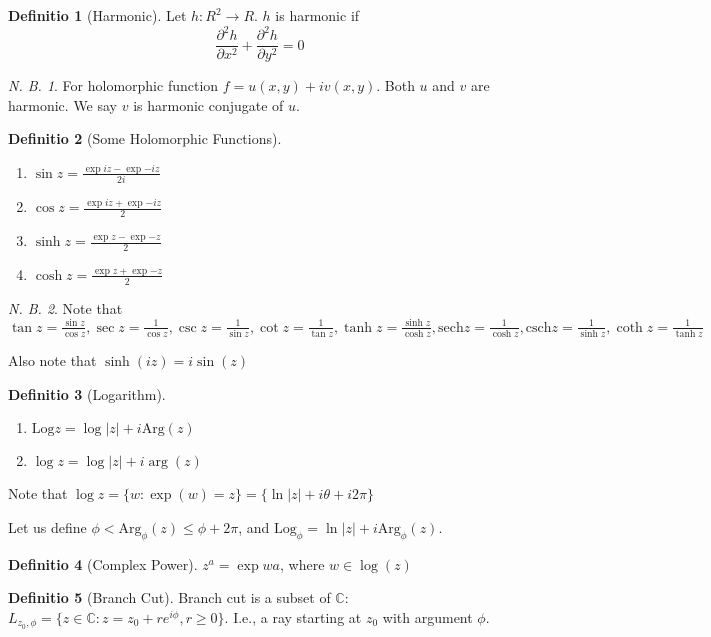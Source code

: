 \documentclass[12pt, a4paper]{article}
\theoremstyle{definition}
\newtheorem{definition}{Definitio}[section]
\theoremstyle{remark}
\newtheorem{note}{N. B.}[section]
\newcommand{\bb}[1]{\mathbb{#1}}
\newcommand{\Arg}{\text{Arg}}
\newcommand{\Log}{\text{Log}}
\newcommand{\sech}{\text{sech}}
\newcommand{\csch}{\text{csch}}
\begin{document}
\begin{definition}[Harmonic]
	Let $h: R^2 \rightarrow  R$. $h$ is harmonic if 
	$$
	\frac{\partial^2 h}{\partial x^2} + \frac{\partial^2 h}{\partial y^2} = 0
	$$
\end{definition}

\begin{note}
	For holomorphic function $f = u(x,y) + iv(x,y)$. Both $u$ and $v$ are harmonic. We say $v$ is harmonic conjugate of $u$.
\end{note}

\begin{definition}[Some Holomorphic Functions]
	\ 
	\begin{enumerate}
	\item $\sin z = \frac{\exp{iz} - \exp{-iz}}{2i}$
		\item $\cos z = \frac{\exp{iz} + \exp{-iz}}{2}$
		\item $\sinh z = \frac{\exp{z} - \exp{-z}}{2}$
		\item $\cosh z = \frac{\exp{z} + \exp{-z}}{2}$
	\end{enumerate}
\end{definition}

\begin{note}
	Note that $\tan z = \frac{\sin z}{\cos z}, \sec z = \frac{1}{\cos z}, \csc z = \frac{1}{\sin z}, \cot z = \frac{1}{\tan z}, \tanh z = \frac{\sinh z}{\cosh z}, \sech z = \frac{1}{\cosh z}, \csch z = \frac{1}{\sinh z}, \coth z = \frac{1}{\tanh z}$
	
	Also note that $\sinh(iz) = i\sin(z)$
\end{note}

\begin{definition}[Logarithm]
	\ 
	\begin{enumerate}
		\item $\Log z = \log |z| + i\Arg(z)$
		\item $\log z = \log |z| + i\arg(z)$
	\end{enumerate}
	Note that $\log z = \{w: \exp(w) = z\} = \{\ln|z| + i\theta + i 2\pi\}$

	Let us define $\phi <\Arg_{\phi}(z) \leq \phi + 2\pi$, and $\Log_{\phi} = \ln |z| + i \Arg_{\phi}(z)$.
\end{definition}
\begin{definition}[Complex Power]
	$z^{a} = \exp{wa}$, where $w \in \log(z)$
\end{definition}
\begin{definition}[Branch Cut]
	Branch cut is a subset of $\bb{C}$: $L_{z_0, \phi} = \{z \in \bb{C}: z = z_0 + re^{i \phi}, r \geq 0\}$. I.e., a ray starting at $z_0$ with argument $\phi$.
\end{definition}
\end{document}

